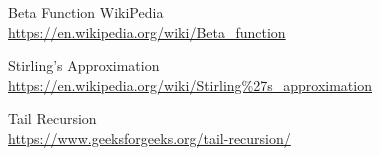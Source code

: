 \documentclass[a4paper, 12pt]{article}
\begin{document}
\begin{thebibliography}{15}

Beta Function WikiPedia
\\\href{https://en.wikipedia.org/wiki/Beta\_function}{https://en.wikipedia.org/wiki/Beta\_function}

Stirling's Approximation
\\\href{https://en.wikipedia.org/wiki/Stirling\%27s\_approximation}{https://en.wikipedia.org/wiki/Stirling\%27s\_approximation}

Tail Recursion
\\\href{https://www.geeksforgeeks.org/tail-recursion/}{https://www.geeksforgeeks.org/tail-recursion/}

\end{thebibliography}
\end{document}
